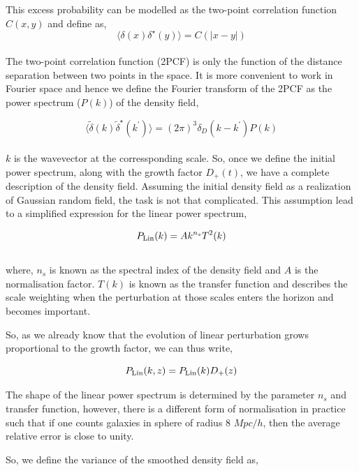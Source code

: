 This excess probability can be modelled as the two-point correlation function $C(x,y)$ and define as, 
\begin{equation}
	\langle \delta(x) \delta^{\star}(y) \rangle = C(|x-y|)
\end{equation}
\\
The two-point correlation function (2PCF) is only the function of the distance
separation between two points in the space. It is more convenient to work in 
Fourier space and hence we define the Fourier transform of the 2PCF as the 
power spectrum ($P(k)$) of the density field,

\begin{equation}
		\langle \tilde{\delta}(k) \tilde{\delta}^{\star}(k^{\prime}) \rangle = 
				(2\pi)^3 \delta_D(k-k^{\prime}) P(k)
\end{equation}
\\
$k$ is the wavevector at the corressponding scale. So, once we define the initial
power spectrum, along with the growth factor $D_+(t)$, we have a complete description
of the density field. Assuming the initial density field as a realization of Gaussian
random field, the task is not that complicated. This assumption lead to a simplified
expression for the linear power spectrum,

\begin{equation}
	P_{\rm Lin}(k) = A k^{n_s} T^2(k)
\end{equation}
\\
where, $n_s$ is known as the spectral index of the density field and $A$ is the
normalisation factor. $T(k)$ is known as the transfer function and describes
the scale weighting when the perturbation at those scales enters the horizon
and becomes important. 

So, as we already know that the evolution of linear perturbation grows 
proportional to the growth factor, we can thus write,

\begin{equation}
	P_{\rm Lin}(k,z) = P_{\rm Lin}(k) D_+(z)
\end{equation}

The shape of the linear power spectrum is determined by the parameter $n_s$ and 
transfer function, however, there is a different form of normalisation in 
practice such that if one counts galaxies in sphere of radius 8 $Mpc/h$, then
the average relative error is close to unity. 

So, we define the variance of the smoothed density field as,

